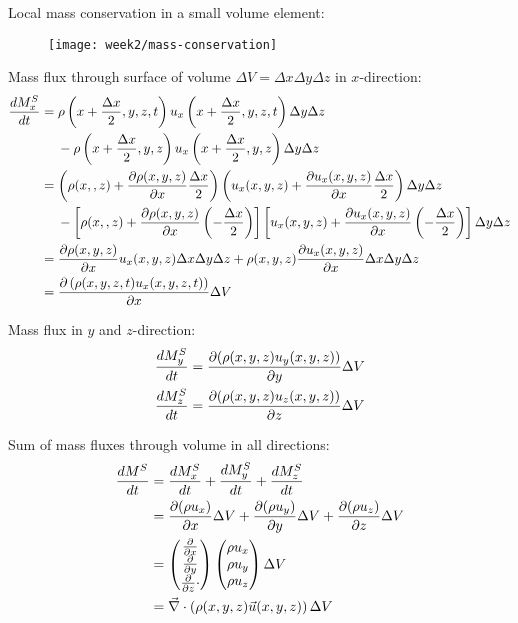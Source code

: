 Local mass conservation in a small volume element:
\begin{figure}[!h]
    \centering
    \texttt{[image: week2/mass-conservation]}
    \caption{}
    \label{fig:mass-conservation}
\end{figure}

Mass flux through surface of volume $\Delta V = \Delta x \Delta y \Delta z$ in $x$-direction:
\begin{align}
\begin{split}
\frac{d M_x^S}{d t} &= \rho \left(x+\frac{\Delta x}{2},y,z,t\right)u_x\left(x+\frac{\Delta x}{2},y,z,t\right)\Delta y \Delta z\\
&\hspace{4.5mm} - \rho \left(x+\frac{\Delta x}{2},y,z\right)u_x\left(x+\frac{\Delta x}{2},y,z\right)\Delta y \Delta z
\\
&=\left(\rho(x,,z)+\frac{\partial \rho(x,y,z)}{\partial x}\frac{\Delta x}{2}\right)\left(u_x(x,y,z)+\frac{\partial u_x(x,y,z)}{\partial x}\frac{\Delta x}{2}\right) \Delta y \Delta z \\
&\hspace{4.5mm} - \left[\rho(x,,z)+\frac{\partial \rho(x,y,z)}{\partial x}\left(-\frac{\Delta x}{2}\right)\right]\left[u_x(x,y,z)+\frac{\partial u_x(x,y,z)}{\partial x}\left(-\frac{\Delta x}{2}\right)\right] \Delta y \Delta z
\\
&=\frac{\partial \rho(x,y,z)}{\partial x}u_x(x,y,z)\Delta x \Delta y \Delta z  + \rho(x,y,z)\frac{\partial u_x(x,y,z)}{\partial x}\Delta x \Delta y \Delta z\\
&=\frac{\partial \left(\rho(x,y,z,t)u_x(x,y,z,t)\right)}{\partial x}\Delta V
\end{split}
\end{align}

Mass flux in $y$ and $z$-direction:
\begin{align}
\frac{d M_y^S}{d t} &= \frac{\partial (\rho(x,y,z)u_y(x,y,z))}{\partial y}\Delta V\\
\frac{d M_z^S}{d t} &= \frac{\partial (\rho(x,y,z)u_z(x,y,z))}{\partial z}\Delta V
\end{align}

Sum of mass fluxes through volume in all directions:
\begin{align}
\frac{d M^S}{d t} &= \frac{d M_x^S}{d t} + \frac{d M_y^S}{d t} + \frac{d M_z^S}{d t} \\
&= \frac{\partial (\rho u_x)}{\partial x}\Delta V + \frac{\partial (\rho u_y)}{\partial y}\Delta V + \frac{\partial (\rho u_z)}{\partial z}\Delta V\\
&=
\begin{pmatrix}
\frac{\partial }{\partial x} \\ \frac{\partial }{\partial y} \\ \frac{\partial }{\partial z} \cdot
\end{pmatrix}
\begin{pmatrix}
\rho u_x \\ \rho u_y \\ \rho u_z
\end{pmatrix}
\Delta V \\
&= \vec{\nabla}\cdot\left(\rho(x,y,z)\vec{u}(x,y,z)\right)\Delta V
\end{align}

